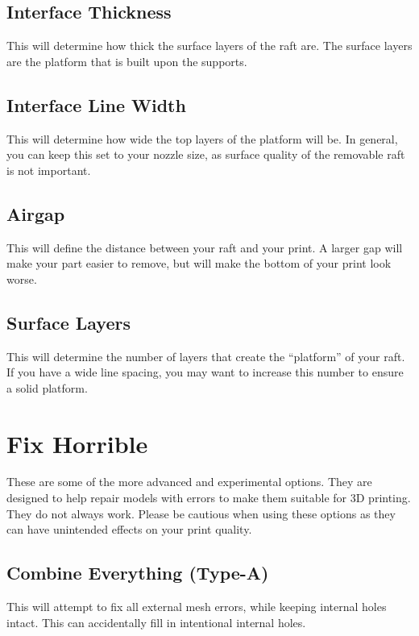 \subsection{Interface Thickness}
This will determine how thick the surface layers of the raft are. The surface layers are the platform that is built upon the supports.

\subsection{Interface Line Width}
This will determine how wide the top layers of the platform will be. In general, you can keep this set to your nozzle size, as surface quality of the removable raft is not important.

\subsection{Airgap}
This will define the distance between your raft and your print. A larger gap will make your part easier to remove, but will make the bottom of your print look worse.

\subsection{Surface Layers}
This will determine the number of layers that create the “platform” of your raft. If you have a wide line spacing, you may want to increase this number to ensure a solid platform. 

\section{Fix Horrible}
These are some of the more advanced and experimental options. They are designed to help repair models with errors to make them suitable for 3D printing. They do not always work. Please be cautious when using these options as they can have unintended effects on your print quality.

\subsection{Combine Everything (Type-A)}
This will attempt to fix all external mesh errors, while keeping internal holes intact. This can accidentally fill in intentional internal holes.


